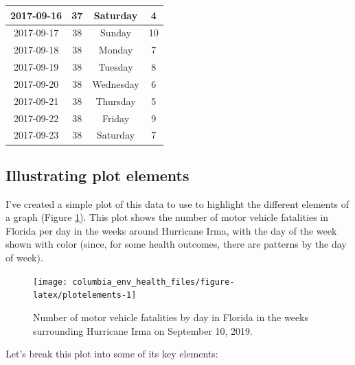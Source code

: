 \documentclass[]{tufte-book}
\begin{document}
\begin{table}[t]
\begin{tabular}{c|c|c|c}
\hline
2017-09-16 & 37 & Saturday & 4\\
\hline
2017-09-17 & 38 & Sunday & 10\\
\hline
2017-09-18 & 38 & Monday & 7\\
\hline
2017-09-19 & 38 & Tuesday & 8\\
\hline
2017-09-20 & 38 & Wednesday & 6\\
\hline
2017-09-21 & 38 & Thursday & 5\\
\hline
2017-09-22 & 38 & Friday & 9\\
\hline
2017-09-23 & 38 & Saturday & 7\\
\hline
\end{tabular}
\end{table}

\hypertarget{illustrating-plot-elements}{%
\subsection{Illustrating plot elements}\label{illustrating-plot-elements}}

I've created a simple plot of this data to use to highlight the different
elements of a graph (Figure \ref{fig:plotelements}). This plot shows the
number of motor vehicle fatalities
in Florida per day in the weeks around Hurricane Irma, with the day of the week shown
with color (since, for some health outcomes, there are patterns by the day
of week).

\begin{figure}
\texttt{[image: columbia\_env\_health\_files/figure-latex/plotelements-1]} \caption[Number of motor vehicle fatalities by day in Florida in the weeks surrounding Hurricane Irma on September 10, 2019]{Number of motor vehicle fatalities by day in Florida in the weeks surrounding Hurricane Irma on September 10, 2019.}\label{fig:plotelements}
\end{figure}

Let's break this plot into some of its key elements:
\end{document}
